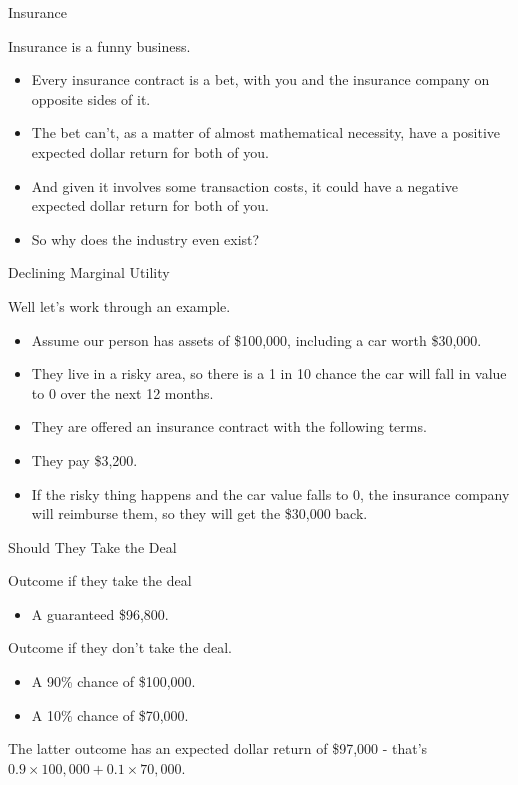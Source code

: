 \documentclass[
  ignorenonframetext,
]{beamer}
\providecommand{\tightlist}{%
  \setlength{\itemsep}{0pt}\setlength{\parskip}{0pt}}
\renewcommand{\,}{\text{, }}
\begin{document}
\begin{frame}{Insurance}
\protect\hypertarget{insurance-2}{}

Insurance is a funny business.

\begin{itemize}
\tightlist
\item
  Every insurance contract is a bet, with you and the insurance company
  on opposite sides of it.
\item
  The bet can't, as a matter of almost mathematical necessity, have a
  positive expected dollar return for both of you.
\item
  And given it involves some transaction costs, it could have a negative
  expected dollar return for both of you.
\item
  So why does the industry even exist?
\end{itemize}

\end{frame}

\begin{frame}{Declining Marginal Utility}
\protect\hypertarget{declining-marginal-utility}{}

Well let's work through an example.

\begin{itemize}
\tightlist
\item
  Assume our person has assets of \$100,000, including a car worth
  \$30,000.
\item
  They live in a risky area, so there is a 1 in 10 chance the car will
  fall in value to 0 over the next 12 months.
\item
  They are offered an insurance contract with the following terms.
\item
  They pay \$3,200.
\item
  If the risky thing happens and the car value falls to 0, the insurance
  company will reimburse them, so they will get the \$30,000 back.
\end{itemize}

\end{frame}

\begin{frame}{Should They Take the Deal}
\protect\hypertarget{should-they-take-the-deal}{}

Outcome if they take the deal

\begin{itemize}
\tightlist
\item
  A guaranteed \$96,800. \pause
\end{itemize}

Outcome if they don't take the deal.

\begin{itemize}
\tightlist
\item
  A 90\% chance of \$100,000.
\item
  A 10\% chance of \$70,000. \pause
\end{itemize}

The latter outcome has an expected dollar return of \$97,000 - that's
\(0.9 \times 100,000 + 0.1 \times 70,000\).

\end{frame}
\end{document}
